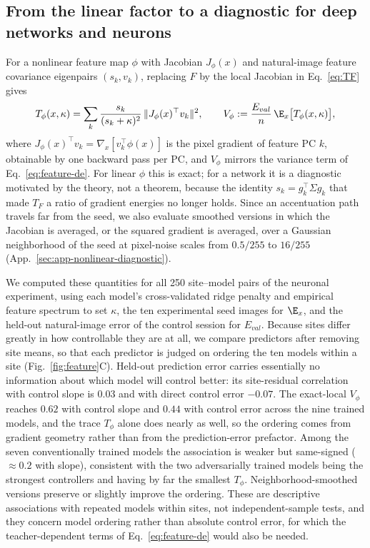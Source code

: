 \subsection{From the linear factor to a diagnostic for deep networks and neurons}
\label{sec:nonlinear}
For a nonlinear feature map $\phi$ with Jacobian $J_\phi(x)$ and natural-image feature covariance eigenpairs $(s_k,v_k)$, replacing $F$ by the local Jacobian in Eq.~\ref{eq:TF} gives
\begin{equation}
T_\phi(x,\kappa)=\sum_k\frac{s_k}{(s_k+\kappa)^2}\,\|J_\phi(x)^\top v_k\|^2,
\qquad
V_\phi:=\frac{E_{val}}{n}\,\E_x\big[T_\phi(x,\kappa)\big],
\label{eq:Tphi}
\end{equation}
where $J_\phi(x)^\top v_k=\nabla_x[v_k^\top\phi(x)]$ is the pixel gradient of feature PC $k$, obtainable by one backward pass per PC, and $V_\phi$ mirrors the variance term of Eq.~\ref{eq:feature-de}. For linear $\phi$ this is exact; for a network it is a diagnostic motivated by the theory, not a theorem, because the identity $s_k=g_k^\top\Sigma g_k$ that made $T_F$ a ratio of gradient energies no longer holds. Since an accentuation path travels far from the seed, we also evaluate smoothed versions in which the Jacobian is averaged, or the squared gradient is averaged, over a Gaussian neighborhood of the seed at pixel-noise scales from $0.5/255$ to $16/255$ (App.~\ref{sec:app-nonlinear-diagnostic}).

We computed these quantities for all 250 site--model pairs of the neuronal experiment, using each model's cross-validated ridge penalty and empirical feature spectrum to set $\kappa$, the ten experimental seed images for $\E_x$, and the held-out natural-image error of the control session for $E_{val}$. Because sites differ greatly in how controllable they are at all, we compare predictors after removing site means, so that each predictor is judged on ordering the ten models within a site (Fig.~\ref{fig:feature}C). Held-out prediction error carries essentially no information about which model will control better: its site-residual correlation with control slope is $0.03$ and with direct control error $-0.07$. The exact-local $V_\phi$ reaches $0.62$ with control slope and $0.44$ with control error across the nine trained models, and the trace $T_\phi$ alone does nearly as well, so the ordering comes from gradient geometry rather than from the prediction-error prefactor. Among the seven conventionally trained models the association is weaker but same-signed ($\approx0.2$ with slope), consistent with the two adversarially trained models being the strongest controllers and having by far the smallest $T_\phi$. Neighborhood-smoothed versions preserve or slightly improve the ordering. These are descriptive associations with repeated models within sites, not independent-sample tests, and they concern model ordering rather than absolute control error, for which the teacher-dependent terms of Eq.~\ref{eq:feature-de} would also be needed.

